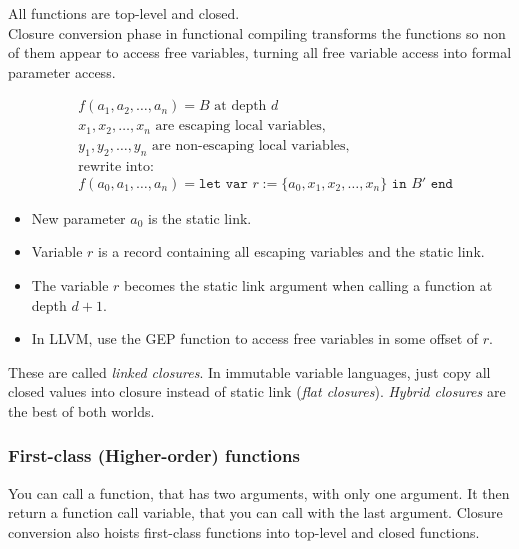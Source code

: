 All functions are top-level and closed.\\

Closure conversion phase in functional compiling transforms the functions so non of them appear to access free variables, turning all free variable access into formal parameter access.

\begin{align*}
    &f(a_1, a_2, \dots, a_n) = B \text{ at depth }d\\
    &x_1, x_2, \dots, x_n \text{ are escaping local variables,}\\
    &y_1, y_2, \dots, y_n \text{ are non-escaping local variables,}\\
    &\text{rewrite into:}\\
    & f(a_0, a_1, \dots, a_n) = \texttt{let var }r :=\{a_0, x_1, x_2, \dots, x_n\} \texttt{ in } B' \texttt{ end}
\end{align*}

\begin{itemize}
    \item New parameter $a_0$ is the static link.
    \item Variable $r$ is a record containing all escaping variables and the static link.
    \item The variable $r$ becomes the static link argument when calling a function at depth $d+1$.
    \item In LLVM, use the GEP function to access free variables in some offset of $r$.
\end{itemize}

These are called \textit{linked closures}. In immutable variable languages, just copy all closed values into closure instead of static link (\textit{flat closures}). \textit{Hybrid closures} are the best of both worlds.

\subsubsection{First-class (Higher-order) functions}

You can call a function, that has two arguments, with only one argument. It then return a function call variable, that you can call with the last argument. Closure conversion also hoists first-class functions into top-level and closed functions.

